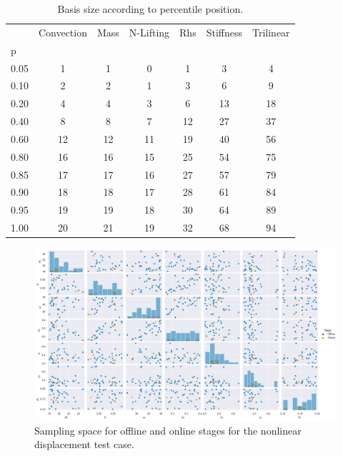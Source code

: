 \documentclass[../../thesis.tex]{subfiles}
\begin{document}
\begin{table}[h]
    \centering
    \caption{Basis size according to percentile position.}
    \begin{tabular}{lcccccc}
        \toprule
        {} & Convection & Mass & N-Lifting & Rhs & Stiffness & Trilinear \\
        p    &            &      &                   &     &           &           \\
        \midrule
        0.05 &          1 &    1 &                 0 &   1 &         3 &         4 \\
        0.10 &          2 &    2 &                 1 &   3 &         6 &         9 \\
        0.20 &          4 &    4 &                 3 &   6 &        13 &        18 \\
        0.40 &          8 &    8 &                 7 &  12 &        27 &        37 \\
        0.60 &         12 &   12 &                11 &  19 &        40 &        56 \\
        0.80 &         16 &   16 &                15 &  25 &        54 &        75 \\
        0.85 &         17 &   17 &                16 &  27 &        57 &        79 \\
        0.90 &         18 &   18 &                17 &  28 &        61 &        84 \\
        0.95 &         19 &   19 &                18 &  30 &        64 &        89 \\
        1.00 &         20 &   21 &                19 &  32 &        68 &        94 \\
        \bottomrule
    \end{tabular}        
    \label{tab:arbitrary_displacement_size_percentile}
\end{table}

\begin{figure}[h]
    \includegraphics[width =\columnwidth]{research_project/piston/figures/nonlinear_displacement/separable/sampling_space.png}
    \caption{Sampling space for offline and online stages 
    for the nonlinear displacement test case.}
    \label{fig:nlinear_disp_operators_sampling_space}
\end{figure}
\end{document}
